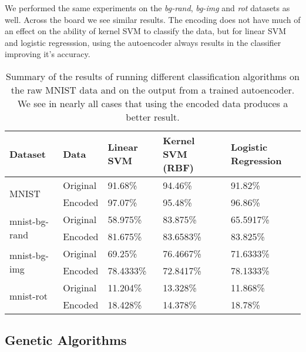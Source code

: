 We performed the same experiments on the \textit{bg-rand}, \textit{bg-img} and 
\textit{rot} datasets as well. Across the board we see similar results. The encoding does not have much of
an effect on the ability of kernel SVM to classify the data, but for linear SVM and logistic regresssion, 
using the autoencoder always results in the classifier improving it's accuracy. 


\begin{table}[h]
	\centering
\begin{tabular}{ll|lll}
    Dataset                        & Data               & Linear SVM & Kernel SVM (RBF) & Logistic Regression \\ \hline
    \multirow{2}{*}{MNIST}         & Original           & 91.68\%    & 94.46\%          & 91.82\%             \\
                                   & Encoded            & 97.07\%    & 95.48\%          & 96.86\%             \\ \hline
    \multirow{2}{*}{mnist-bg-rand} & Original           & 58.975\%   & 83.875\%         & 65.5917\%           \\
                                   & Encoded            & 81.675\%   & 83.6583\%        & 83.825\%            \\ \hline
    \multirow{2}{*}{mnist-bg-img}  & Original           & 69.25\%    & 76.4667\%        & 71.6333\%           \\
                                   & Encoded            & 78.4333\%  & 72.8417\%        & 78.1333\%           \\ \hline
    \multirow{2}{*}{mnist-rot}     & Original           & 11.204\%   & 13.328\%         & 11.868\%           \\
                                   & Encoded            & 18.428\%   & 14.378\%         & 18.78\%
\end{tabular}
	\caption{Summary of the results of running different classification algorithms on the raw MNIST data and on the output from a trained autoencoder. We
	see in nearly all cases that using the encoded data produces a better result.}
	\label{tab:classvsenc}
\end{table}

\subsection{Genetic Algorithms}

